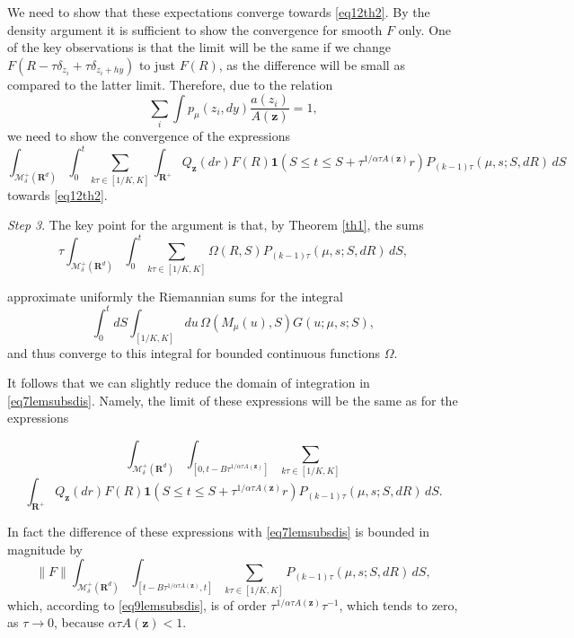 \documentclass[12pt]{article}
\def\MC{\mathcal{M}}
\def\R{\mathbf{R}}
\def\1{\mathbf{1}}
\def\z{\mathbf{z}}
\def\al{\alpha}
\def\de{\delta}
\newcommand{\Om}{\Omega}
\numberwithin{equation}{section}
\begin{document}
We need to show that these expectations converge towards \eqref{eq12th2}.
By the density argument it is sufficient to show the convergence for smooth $F$ only.
One of the key observations is that the limit will be the same
if we change $F\left(R-\tau\de_{z_i}+\tau\de_{z_i+hy}\right)$ to just $F(R)$,
as the difference will be small as compared to the latter limit.
Therefore, due to the relation
\[
\sum_i \int p_{\mu}(z_i, dy)\frac{a(z_i)}{A(\z)}=1,
\]
we need to show the convergence of the expressions
\begin{equation}
 \label{eq7lemsubsdis}
 \int_{\MC^+_{\delta}(\R^d)} \int_0^t \sum_{k \tau \in  [1/K,K]}
 \int_{\R^+} Q_{\z}(dr)
F(R) \1(S\le t\le S+\tau^{1/\al \tau A(\z)}r)
 P_{(k-1)\tau}(\mu,s; S, dR)\, dS
\end{equation}
 towards \eqref{eq12th2}.

{\it Step 3}.
The key point for the argument is that, by Theorem \ref{th1}, the sums
 \begin{equation}
 \label{eq8lemsubsdis}
\tau \int_{\MC^+_{\delta}(\R^d)} \int_0^t \sum_{k \tau \in  [1/K,K]}
\Om(R,S) P_{(k-1)\tau}(\mu,s; S, dR)\, dS,
 \end{equation}

approximate uniformly the Riemannian sums for the integral
 \begin{equation}
 \label{eq9lemsubsdis}
 \int_0^t dS \int_{[1/K,K]} du
\, \Om(M_{\mu}(u),S) G(u; \mu,s; S),
 \end{equation}
 and thus converge to this integral for bounded continuous functions $\Om$.

It follows that we can slightly reduce the domain of integration in \eqref{eq7lemsubsdis}.
Namely, the limit of these expressions
will be the same as for the expressions

\[
 \int_{\MC^+_{\delta}(\R^d)}  \int_{[0,t-B\tau^{1/\al \tau A(\z)}]}  \sum_{k \tau \in  [1/K,K]}
\]
\begin{equation}
	\label{eq10lemsubsdis}
 \int_{\R^+} Q_{\z}(dr)
F(R) \1(S\le t\le S+\tau^{1/\al \tau A(\z)}r)
 P_{(k-1)\tau}(\mu,s; S, dR)\, dS.
\end{equation}

In fact the difference of these expressions with  \eqref{eq7lemsubsdis} is bounded in magnitude by
\[
 \|F\| \int_{\MC^+_{\delta}(\R^d)}  \int_{[t-B\tau^{1/\al \tau A(\z)},t]}  \sum_{k \tau \in  [1/K,K]}
 P_{(k-1)\tau}(\mu,s; S, dR)\, dS,
 \]
 which, according to \eqref{eq9lemsubsdis}, is of order
 $\tau^{1/\al \tau A(\z)} \tau^{-1}$, which tends to zero, as $\tau \to 0$, because $\al \tau A(\z)<1$.
\end{document}
